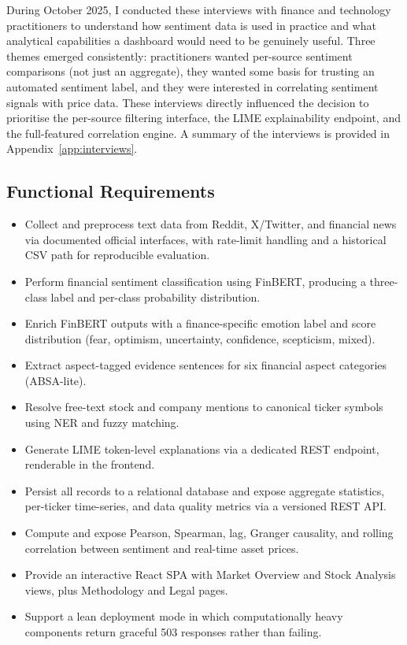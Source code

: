 During October 2025, I conducted these interviews with finance and technology practitioners to understand how sentiment data is used in practice and what analytical capabilities a dashboard would need to be genuinely useful.  Three themes emerged consistently: practitioners wanted per-source sentiment comparisons (not just an aggregate), they wanted some basis for trusting an automated sentiment label, and they were interested in correlating sentiment signals with price data.  These interviews directly influenced the decision to prioritise the per-source filtering interface, the LIME explainability endpoint, and the full-featured correlation engine.  A summary of the interviews is provided in Appendix~\ref{app:interviews}.

\subsection{Functional Requirements}

\begin{itemize}
    \item Collect and preprocess text data from Reddit, X/Twitter, and financial news via documented official interfaces, with rate-limit handling and a historical CSV path for reproducible evaluation.
    \item Perform financial sentiment classification using FinBERT, producing a three-class label and per-class probability distribution.
    \item Enrich FinBERT outputs with a finance-specific emotion label and score distribution (fear, optimism, uncertainty, confidence, scepticism, mixed).
    \item Extract aspect-tagged evidence sentences for six financial aspect categories (ABSA-lite).
    \item Resolve free-text stock and company mentions to canonical ticker symbols using NER and fuzzy matching.
    \item Generate LIME token-level explanations via a dedicated REST endpoint, renderable in the frontend.
    \item Persist all records to a relational database and expose aggregate statistics, per-ticker time-series, and data quality metrics via a versioned REST API.
    \item Compute and expose Pearson, Spearman, lag, Granger causality, and rolling correlation between sentiment and real-time asset prices.
    \item Provide an interactive React SPA with Market Overview and Stock Analysis views, plus Methodology and Legal pages.
    \item Support a lean deployment mode in which computationally heavy components return graceful 503 responses rather than failing.
\end{itemize}

